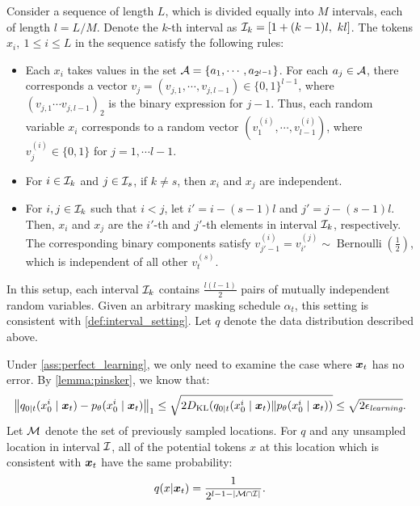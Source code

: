 \begin{example}
\label{exa:interval}
Consider a sequence of length $L$, which is divided equally into $
M$ intervals, each of length $l=L/M$. Denote the $k$-th interval as ${\mathcal{I}}_k=[1+(k-1)l,\ kl]$. The tokens $x_i,\ 1\leq i\leq L$ in the sequence satisfy the following rules:
\begin{itemize}
    \item Each $x_i$ takes values in the set ${\mathcal{A}}=\{a_1,\cdots,a_{2^{l-1}}\}$. For each $a_j\in{\mathcal{A}}$, there corresponds a vector $v_j=(v_{j,1},\cdots,v_{j,l-1})\in\{0,1\}^{l-1}$, where $(v_{j,1}\cdots v_{j,l-1})_2$ is the binary expression for $j-1$. Thus, each random variable $x_i$ corresponds to a random vector $(v_1^{(i)},\cdots,v_{l-1}^{(i)})$, where $v_j^{(i)}\in\{0,1\}$ for $j=1,\cdots l-1$.
    \item For $i\in {\mathcal{I}}_k$ and $j\in {\mathcal{I}}_s$, if $k\neq s$, then $x_i$ and $x_j$ are independent.
    \item For $i, j\in {\mathcal{I}}_k$ such that $i<j$, let $i'=i-(s-1)l$ and $j'=j-(s-1)l$. Then, $x_i$ and $x_j$ are the $i'$-th and $j'$-th elements in interval ${\mathcal{I}}_k$, respectively. The corresponding binary components satisfy $v_{j'-1}^{(i)}=v_{i'}^{(j)}\sim \operatorname{Bernoulli}(\frac{1}{2})$, which is independent of all other $v_t^{(s)}$.
\end{itemize}
In this setup, each interval ${\mathcal{I}}_k$ contains $\frac{l(l-1)}{2}$ pairs of mutually independent random variables. Given an arbitrary masking schedule $\alpha_t$, this setting is consistent with \cref{def:interval_setting}. Let $q$ denote the data distribution described above.

Under \cref{ass:perfect_learning}, we only need to examine the case where ${\bm{x}}_t$ has no error. By \cref{lemma:pinsker}, we know that:
$$\left\lVert q_{0|t}(x_0^i \mid {\bm{x}}_t)-p_{\theta}(x_0^i \mid {\bm{x}}_t)\right\rVert_1\leq \sqrt{2D_{\mathrm{KL}}(q_{0|t}(x_0^i \mid {\bm{x}}_t)\|p_\mathbf{\theta}(x_0^i \mid {\bm{x}}_t))} \leq \sqrt{2{\epsilon}_\textit{learning}}.$$ 
Let ${\mathcal{M}}$ denote the set of previously sampled locations. For $q$ and any unsampled location in interval ${\mathcal{I}}$, all of the potential tokens $x$ at this location which is consistent with ${\bm{x}}_t$ have the same probability:
$$q(x | {\bm{x}}_t)=\frac{1}{2^{l-1-|{\mathcal{M}}\cap{\mathcal{I}}|}}.$$


\end{example}
